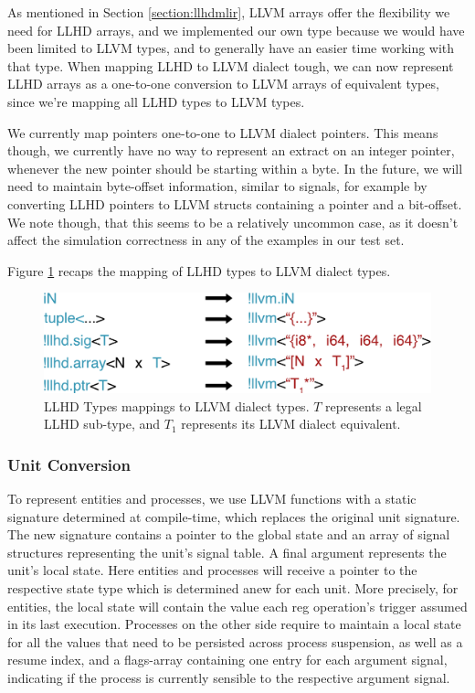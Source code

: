 As mentioned in Section \ref{section:llhdmlir}, LLVM arrays offer the flexibility we need for LLHD arrays, and we implemented our own type because we would have been limited to LLVM types, and to generally have an easier time working with that type. When mapping LLHD to LLVM dialect tough, we can now represent LLHD arrays as a one-to-one conversion to LLVM arrays of equivalent types, since we're mapping all LLHD types to LLVM types.

We currently map pointers one-to-one to LLVM dialect pointers. This means though, we currently have no way to represent an extract on an integer pointer, whenever the new pointer should be starting within a byte. In the future, we will need to maintain byte-offset information, similar to signals, for example by converting LLHD pointers to LLVM structs containing a pointer and a bit-offset. We note though, that this seems to be a relatively uncommon case, as it doesn't affect the simulation correctness in any of the examples in our test set.

Figure \ref{fig:types_mapping} recaps the mapping of LLHD types to LLVM dialect types.

\begin{figure}[ht]
    \centering
    \includegraphics[width=\textwidth]{gfx/Types mappings.png}
    \caption[LLHD Types mappings to LLVM dialect types.]{LLHD Types mappings to LLVM dialect types. $T$ represents a legal LLHD sub-type, and $T_1$ represents its LLVM dialect equivalent.}
    \label{fig:types_mapping}
\end{figure}


\subsubsection{Unit Conversion}
To represent entities and processes, we use LLVM functions with a static signature determined at compile-time, which replaces the original unit signature. The new signature contains a pointer to the global state and an array of signal structures representing the unit's signal table. A final argument represents the unit's local state. Here entities and processes will receive a pointer to the respective state type which is determined anew for each unit. More precisely, for entities, the local state will contain the value each reg operation's trigger assumed in its last execution. Processes on the other side require to maintain a local state for all the values that need to be persisted across process suspension, as well as a resume index, and a flags-array containing one entry for each argument signal, indicating if the process is currently sensible to the respective argument signal.

